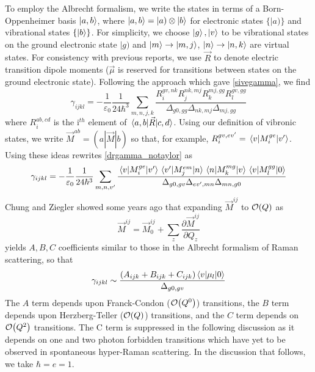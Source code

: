 \documentclass[aip, jcp, reprint, onecolumn]{revtex4-2}
\begin{document}
To employ the Albrecht formalism, we write the states in terms of a Born-Oppenheimer basis $\ket{a,b}$, where $\ket{a,b} = |a) \otimes \ket{b}$ for electronic states $\{|a)\}$ and vibrational states $\{\ket{b}\}$. \cite{BornOppenheimer, Albrecht1960}
For simplicity, we choose $\ket{g}, \ket{v}$ to be vibrational states on the ground electronic state $|g)$ and $\ket{m} \rightarrow \ket{m,j}$, $\ket{n} \rightarrow \ket{n,k}$ are virtual states.
For consistency with previous reports, we use $\vec{R}$ to denote electric transition dipole moments ($\vec{\mu}$ is reserved for transitions between states on the ground electronic state). \cite{Ziegler1974}
Following the approach which gave \autoref{sivegamma}, we find
\begin{equation}\label{drgamma_notaylor}
	\gamma_{ijkl} = -\frac{1}{\varepsilon_0} \frac{1}{24 \hbar^3} \sum_{m,n,j,k} \frac{
		R_{i}^{gv, nk} 
		R_{j}^{nk,mj} 
		R_{k}^{mj,gg} 
		R_{l}^{gv,gg} 
	}{\Delta_{g0,gg}
		\Delta_{nk, mj}
		\Delta_{mj, gg}
	}
\end{equation}
where $R_{i}^{ab,cd}$ is the i$^{th}$ element of $\mel{a,b}{\vec{R}}{c,d}$.\cite{Ziegler1988}
Using our definition of vibronic states, we write $\vec{M}^{ab} = (a|\vec{M}|b)$ so that, for example,
$R_{i}^{gv,ev'} = \mel{v}{M_i^{ge}}{v'}$.\cite{Albrecht1960}
Using these ideas rewrites \autoref{drgamma_notaylor} as
\begin{equation}\label{drgamma_notaylor_1}
	\begin{split}
		\gamma_{ijkl} &= -\frac{1}{\varepsilon_0} \frac{1}{24 \hbar^3} \sum_{m,n,v'} \frac{
			\mel{v}{M_{i}^{ge}}{v'} 
			\mel{v'}{M_{j}^{em}}{n}
			\mel{n}{M_{k}^{mg} }{v}
			\mel{v}{M_{l}^{gg}}{0}
		}{\Delta_{g0,gv}
			\Delta_{ev', mn}
			\Delta_{mn, g0}	} \\
	\end{split}
\end{equation}
Chung and Ziegler showed some years ago that expanding $\vec{M}^{ij}$ to $\order{Q}$ as
\begin{equation}
\vec{M}^{ij} = \vec{M}^{ij}_0 + \sum_z \frac{\partial\vec{M}^{ij}}{\partial Q_z}
\end{equation} yields $A, B, C$ coefficients similar to those in the Albrecht formalism of Raman scattering, \cite{Albrecht1961, Ziegler1988} so that
\begin{equation}
		\gamma_{ijkl} \sim \frac{(A_{ijk} + B_{ijk} + C_{ijk})\mel{v}{\mu_{l}}{0}} {\Delta_{g0,gv}}
\end{equation}
The $A$ term depends upon Franck-Condon ($\order{Q^0}$) transitions, the $B$ term depends upon Herzberg-Teller ($\order{Q}$) transitions, and the $C$ term depends on $\order{Q^2}$ transitions. 
The C term is suppressed in the following discussion as it depends on one and two photon forbidden transitions which have yet to be observed in spontaneous hyper-Raman scattering. \cite{Ziegler1988}
In the discussion that follows, we take $\hbar = e = 1$.
\end{document}
